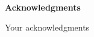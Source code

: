 \newpage
\thispagestyle{plain} 
\vspace*{1cm}
\begin{center}
\textbf{Acknowledgments}
\end{center}
\vspace{1cm}

Your acknowledgments
